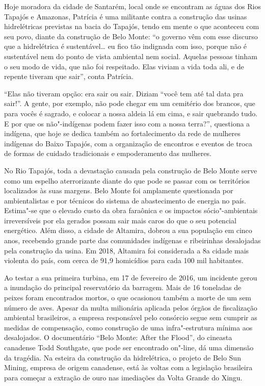Hoje moradora da cidade de Santarém, local onde se encontram as águas
dos Rios Tapajós e Amazonas, Patrícia é uma militante contra a
construção das usinas hidrelétricas previstas na bacia do Tapajós, tendo
em mente o que aconteceu com seu povo, diante da construção de Belo
Monte: ``o governo vêm com esse discurso que a hidrelétrica é
sustentável\ldots{} eu fico tão indignada com isso, porque não é
sustentável nem do ponto de vista ambiental nem social. Aquelas pessoas
tinham o seu modo de vida, que não foi respeitado. Elas viviam a vida
toda ali, e de repente tiveram que sair'', conta Patrícia.

``Elas não tiveram opção: era sair ou sair. Diziam ``você tem até tal
data pra sair!''. A gente, por exemplo, não pode chegar em um cemitério
dos brancos, que para vocês é sagrado, e colocar a nossa aldeia lá em
cima, e sair quebrando tudo. E por que os não"-indígenas podem fazer isso
com a nossa terra?'', questiona a indígena, que hoje se dedica também ao
fortalecimento da rede de mulheres indígenas do Baixo Tapajós, com a
organização de encontros e eventos de troca de formas de cuidado
tradicionais e empoderamento das mulheres.

No Rio Tapajós, toda a devastação causada pela construção de Belo Monte
serve como um espelho aterrorizante diante do que pode se passar com os
territórios localizados às suas margens. Belo Monte foi amplamente
questionada por ambientalistas e por técnicos do sistema de
abastecimento de energia no país. Estima"-se que o elevado custo da obra
faraônica e os impactos sócio"-ambientais irreversíveis por ela gerados
possam sair mais caros do que o seu potencial energético. Além disso, a
cidade de Altamira, dobrou a sua população em cinco anos, recebendo
grande parte das comunidades indígenas e ribeirinhas desalojadas pela
construção da usina. Em 2018, Altamira foi considerada a 8a cidade mais
violenta do país, com cerca de 91,9 homicídios para cada 100 mil
habitantes.

Ao testar a sua primeira turbina, em 17 de fevereiro de 2016, um
incidente gerou a inundação do principal reservatório da barragem. Mais
de 16 toneladas de peixes foram encontrados mortos, o que ocasionou
também a morte de um sem número de aves. Apesar da multa milionária
aplicada pelos órgãos de fiscalização ambiental brasileiros, a empresa
responsável pelo consórcio segue sem cumprir as medidas de compensação,
como construção de uma infra"-estrutura mínima aos desalojados. O
documentário ``Belo Monte: After the Flood'', do cineasta canadense Todd
Southgate, que pode ser encontrado on"-line, dá uma dimensão da tragédia.
Na esteira da construção da hidrelétrica, o projeto de Belo Sun Mining,
empresa de origem canadense, está às voltas com a legislação brasileira
para começar a extração de ouro nas imediações da Volta Grande do Xingu.

